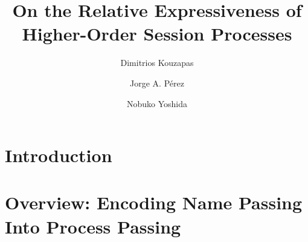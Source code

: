 \documentclass[runningheads]{llncs}
\begin{document}



\title{On the Relative Expressiveness of\\ 
Higher-Order Session Processes
}

\author{
	Dimitrios Kouzapas%
	\and
	Jorge A. P\'{e}rez
	\and Nobuko Yoshida
}
\maketitle









%

%

\section{Introduction}
\label{sec:intro}
%


\section{Overview: Encoding Name Passing Into Process Passing} %
\label{sec:overview}

\end{document}
